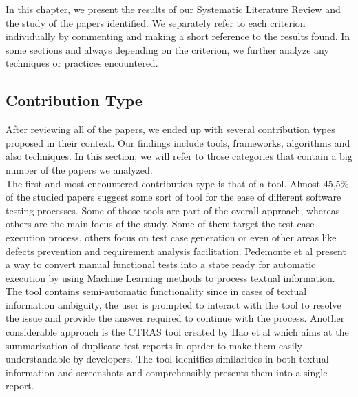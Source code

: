 In this chapter, we present the results of our Systematic Literature Review and the study of the papers identified. We separately refer to 
each criterion individually by commenting and making a short reference to the results found. In some sections and always depending on the criterion, we further analyze any 
techniques or practices encountered. 

\subsection {Contribution Type}
After reviewing all of the papers, we ended up with several contribution types proposed in their context. Our findings include tools, frameworks, algorithms and also techniques. 
In this section, we will refer to those categories that contain a big number of the papers we analyzed.\\

The first and most encountered contribution type is that of a tool. Almost 45,5\% of the studied papers suggest some sort of tool for the ease of different software testing processes. 
Some of those tools are part of the overall approach, whereas others are the main focus of the study. Some of them target the test case execution process, others focus on test case 
generation or even other areas like defects prevention and requirement analysis facilitation. Pedemonte et al \cite{pedemonte2012towards} present a way to convert manual 
functional tests into a state ready for automatic execution by using Machine Learning methods to process textual information. The tool contains semi-automatic functionality since in cases 
of textual information ambiguity, the user is prompted to interact with the tool to resolve the issue and provide the answer required to continue with the process. Another 
considerable approach is the CTRAS tool created by Hao et al \cite{8811987} which aims at the summarization of duplicate test reports in oprder to make them easily understandable 
by developers. The tool idenitfies similarities in both textual information and screenshots and comprehensibly presents them into a single report. \\

